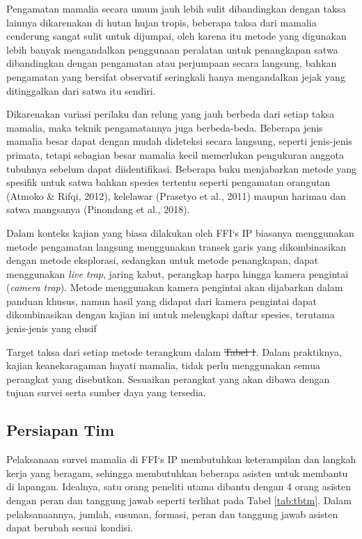 \documentclass[
]{book}
\begin{document}
Pengamatan mamalia secara umum jauh lebih sulit dibandingkan dengan taksa lainnya dikarenakan di hutan hujan tropis, beberapa taksa dari mamalia cenderung sangat sulit untuk dijumpai, oleh karena itu metode yang digunakan lebih banyak mengandalkan penggunaan peralatan untuk penangkapan satwa dibandingkan dengan pengamatan atau perjumpaan secara langsung, bahkan pengamatan yang bersifat observatif seringkali hanya mengandalkan jejak yang ditinggalkan dari satwa itu sendiri.

Dikarenakan variasi perilaku dan relung yang jauh berbeda dari setiap taksa mamalia, maka teknik pengamatannya juga berbeda-beda. Beberapa jenis mamalia besar dapat dengan mudah dideteksi secara langsung, seperti jenis-jenis primata, tetapi sebagian besar mamalia kecil memerlukan pengukuran anggota tubuhnya sebelum dapat diidentifikasi. Beberapa buku menjabarkan metode yang spesifik untuk satwa bahkan spesies tertentu seperti pengamatan orangutan (Atmoko \& Rifqi, 2012), kelelawar (Prasetyo et al., 2011) maupun harimau dan satwa mangsanya (Pinondang et al., 2018).

Dalam konteks kajian yang biasa dilakukan oleh FFI`s IP biasanya menggunakan metode pengamatan langsung menggunakan transek garis yang dikombinasikan dengan metode eksplorasi, sedangkan untuk metode penangkapan, dapat menggunakan \emph{live trap}, jaring kabut, perangkap harpa hingga kamera pengintai (\emph{camera trap}). Metode menggunakan kamera pengintai akan dijabarkan dalam panduan khusus, namun hasil yang didapat dari kamera pengintai dapat dikombinasikan dengan kajian ini untuk melengkapi daftar spesies, terutama jenis-jenis yang elusif

Target taksa dari setiap metode terangkum dalam \sout{Tabel 1}. Dalam praktiknya, kajian keanekaragaman hayati mamalia, tidak perlu menggunakan semua perangkat yang disebutkan. Sesuaikan perangkat yang akan dibawa dengan tujuan survei serta sumber daya yang tersedia.

\hypertarget{persiapan-tim-2}{%
\subsection*{Persiapan Tim}\label{persiapan-tim-2}}

Pelaksanaan survei mamalia di FFI`s IP membutuhkan keterampilan dan langkah kerja yang beragam, sehingga membutuhkan beberapa asisten untuk membantu di lapangan. Idealnya, satu orang peneliti utama dibantu dengan 4 orang asisten dengan peran dan tanggung jawab seperti terlihat pada Tabel \ref{tab:tbtm}. Dalam pelaksanaannya, jumlah, susunan, formasi, peran dan tanggung jawab asisten dapat berubah sesuai kondisi.
\end{document}
